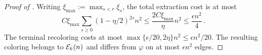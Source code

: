 \begin{proof}[Proof of ]
Writing $\xi_{\max}:=\max_{s<r}\xi_s$, the total extraction cost is at most
$$C\xi_{\max}\sum_{s\geq0}(1-\eta/2)^{2s}n^2\leq\frac{2C\xi_{\max}}{\eta}n^2\leq\frac{\epsilon n^2}{4}\,.$$
The terminal recoloring costs at most $\max\{\epsilon/20,2\eta\}n^2\leq\epsilon n^2/20$. The resulting coloring belongs to ${\mathcal E}_k(n)$ and differs from $\varphi$ on at most $\epsilon n^2$ edges.
\end{proof}
